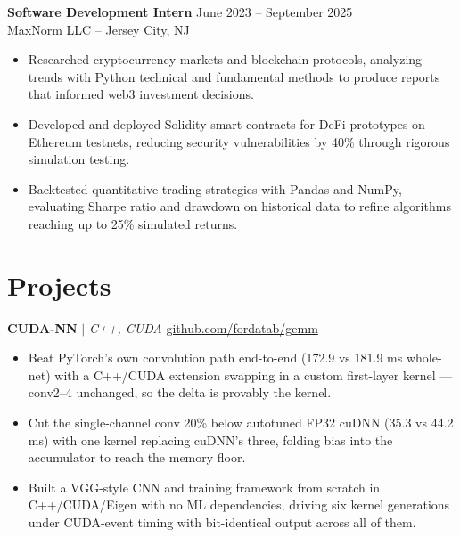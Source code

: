\documentclass[10pt]{article}
\begin{document}
\textbf{Software Development Intern} \hfill June 2023 -- September 2025 \\
MaxNorm LLC -- Jersey City, NJ 
\vspace{-2pt}
\begin{itemize}
    \item Researched cryptocurrency markets and blockchain protocols, analyzing trends with Python technical and fundamental methods to produce reports that informed web3 investment decisions.
    \item Developed and deployed Solidity smart contracts for DeFi prototypes on Ethereum testnets, reducing security vulnerabilities by 40\% through rigorous simulation testing.
    \item Backtested quantitative trading strategies with Pandas and NumPy, evaluating Sharpe ratio and drawdown on historical data to refine algorithms reaching up to 25\% simulated returns.
\end{itemize}
\vspace{-16pt}

\section*{Projects}

\textbf{CUDA-NN} $|$ \emph{C++, CUDA} \hfill \href{https://github.com/fordatab/gemm}{github.com/fordatab/gemm}
\vspace{-2pt}
\begin{itemize}
    \item Beat PyTorch's own convolution path end-to-end (172.9 vs 181.9 ms whole-net) with a C++/CUDA extension swapping in a custom first-layer kernel --- conv2--4 unchanged, so the delta is provably the kernel.
    \item Cut the single-channel conv 20\% below autotuned FP32 cuDNN (35.3 vs 44.2 ms) with one kernel replacing cuDNN's three, folding bias into the accumulator to reach the memory floor.
    \item Built a VGG-style CNN and training framework from scratch in C++/CUDA/Eigen with no ML dependencies, driving six kernel generations under CUDA-event timing with bit-identical output across all of them.
\end{itemize}
\vspace{2pt}
\end{document}
